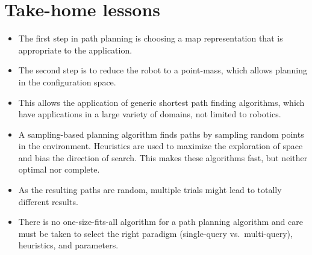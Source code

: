 \section*{Take-home lessons}
\begin{itemize}
\item The first step in path planning is choosing a map representation that is appropriate to the application.
\item The second step is to reduce the robot to a point-mass, which allows planning in the configuration space.
\item This allows the application of generic shortest path finding algorithms, which have applications in a large variety of domains, not limited to robotics.
\item A sampling-based planning algorithm finds paths by sampling random points in the environment. Heuristics are used to maximize the exploration of space and bias the direction of search. This makes these algorithms fast, but neither optimal nor complete.
\item As the resulting paths are random, multiple trials might lead to totally different results.
\item There is no one-size-fits-all algorithm for a path planning algorithm and care must be taken to select the right paradigm (single-query vs.\ multi-query), heuristics, and parameters.
\end{itemize}

